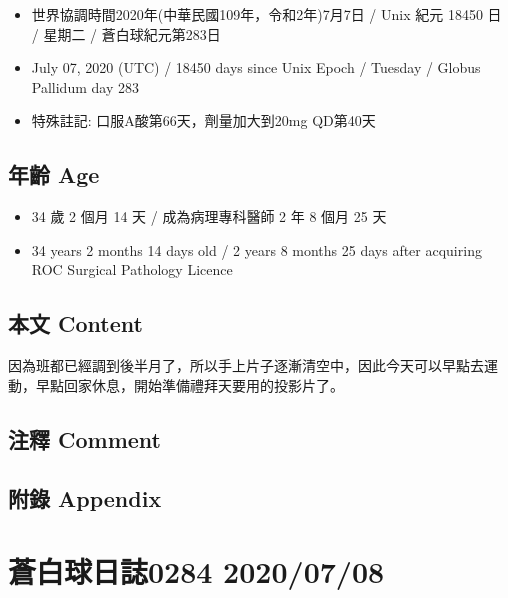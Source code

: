 \documentclass[a5paper, 11pt
]{book}
\providecommand{\tightlist}{%
  \setlength{\itemsep}{0pt}\setlength{\parskip}{0pt}}
\begin{document}
\begin{itemize}
\tightlist
\item
  世界協調時間2020年(中華民國109年，令和2年)7月7日 / Unix 紀元 18450 日
  / 星期二 / 蒼白球紀元第283日
\item
  July 07, 2020 (UTC) / 18450 days since Unix Epoch / Tuesday / Globus
  Pallidum day 283
\item
  特殊註記: 口服A酸第66天，劑量加大到20mg QD第40天
\end{itemize}

\hypertarget{ux5e74ux9f61-age-36}{%
\subsection{年齡 Age}\label{ux5e74ux9f61-age-36}}

\begin{itemize}
\tightlist
\item
  34 歲 2 個月 14 天 / 成為病理專科醫師 2 年 8 個月 25 天
\item
  34 years 2 months 14 days old / 2 years 8 months 25 days after
  acquiring ROC Surgical Pathology Licence
\end{itemize}

\hypertarget{ux672cux6587-content-36}{%
\subsection{本文 Content}\label{ux672cux6587-content-36}}

因為班都已經調到後半月了，所以手上片子逐漸清空中，因此今天可以早點去運動，早點回家休息，開始準備禮拜天要用的投影片了。

\hypertarget{ux6ce8ux91cb-comment-36}{%
\subsection{注釋 Comment}\label{ux6ce8ux91cb-comment-36}}

\hypertarget{ux9644ux9304-appendix-36}{%
\subsection{附錄 Appendix}\label{ux9644ux9304-appendix-36}}

\hypertarget{ux84bcux767dux7403ux65e5ux8a8c0284-20200708}{%
\section{蒼白球日誌0284
2020/07/08}\label{ux84bcux767dux7403ux65e5ux8a8c0284-20200708}}
\end{document}
